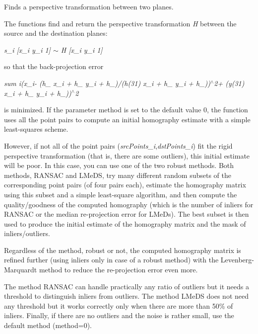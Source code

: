 Finds a perspective transformation between two planes.

The functions find and return the perspective transformation {\itshape H} between the source and the destination planes\+:

{\itshape s\+\_\+i \mbox{[}x\textquotesingle{}\+\_\+i y\textquotesingle{}\+\_\+i 1\mbox{]} $\sim$ H \mbox{[}x\+\_\+i y\+\_\+i 1\mbox{]}}

so that the back-\/projection error

{\itshape sum {\itshape i(x\textquotesingle{}\+\_\+i-\/ (h\+\_ x\+\_\+i + h\+\_ y\+\_\+i + h\+\_)/(h}(31) x\+\_\+i + h\+\_ y\+\_\+i + h\+\_))$^\wedge$2+ (y(31) x\+\_\+i + h\+\_ y\+\_\+i + h\+\_))$^\wedge$2}

is minimized. If the parameter {\ttfamily method} is set to the default value 0, the function uses all the point pairs to compute an initial homography estimate with a simple least-\/squares scheme.

However, if not all of the point pairs ({\itshape src\+Points\+\_\+i},{\itshape dst\+Points\+\_\+i}) fit the rigid perspective transformation (that is, there are some outliers), this initial estimate will be poor. In this case, you can use one of the two robust methods. Both methods, {\ttfamily R\+A\+N\+S\+AC} and {\ttfamily L\+Me\+DS}, try many different random subsets of the corresponding point pairs (of four pairs each), estimate the homography matrix using this subset and a simple least-\/square algorithm, and then compute the quality/goodness of the computed homography (which is the number of inliers for R\+A\+N\+S\+AC or the median re-\/projection error for L\+Me\+Ds). The best subset is then used to produce the initial estimate of the homography matrix and the mask of inliers/outliers.

Regardless of the method, robust or not, the computed homography matrix is refined further (using inliers only in case of a robust method) with the Levenberg-\/\+Marquardt method to reduce the re-\/projection error even more.

The method {\ttfamily R\+A\+N\+S\+AC} can handle practically any ratio of outliers but it needs a threshold to distinguish inliers from outliers. The method {\ttfamily L\+Me\+DS} does not need any threshold but it works correctly only when there are more than 50\% of inliers. Finally, if there are no outliers and the noise is rather small, use the default method ({\ttfamily method=0}).

